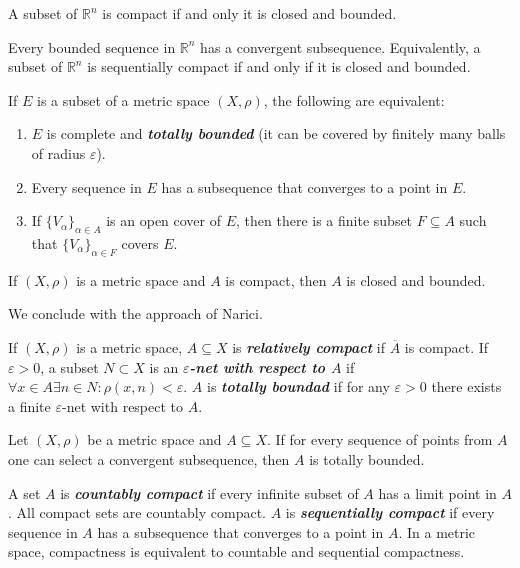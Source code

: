 \documentclass{article}
\theoremstyle{definition}
\numberwithin{equation}{section}
\newcommand{\R}{\mathbb{R}}
\begin{document}
	\begin{thm}
		A subset of $\R^n$ is compact if and only it is closed and bounded.
	\end{thm}
	\begin{thm}
		Every bounded sequence in $\R^n$ has a convergent subsequence. Equivalently, a subset of $\R^n$ is sequentially compact if and only if it is closed and bounded.
	\end{thm}
	\begin{thm}
		If $E$ is a subset of a metric space $(X,\rho)$, the following are equivalent:
		\begin{enumerate}
			\item $E$ is complete and \textbf{\textit{totally bounded}} (it can be covered by finitely many balls of radius $\varepsilon$).
			\item Every sequence in $E$ has a subsequence that converges to a point in $E$.
			\item If $\{V_\alpha\}_{\alpha\in A}$ is an open cover of $E$, then there is a finite subset $F\subseteq A$ such that $\{V_\alpha\}_{\alpha\in F}$ covers $E$.
		\end{enumerate}
	\end{thm}
	\begin{thm}
		If $(X,\rho)$ is a metric space and $A$ is compact, then $A$ is closed and bounded.
	\end{thm}
	We conclude with the approach of Narici.
	
	If $(X,\rho)$ is a metric space, $A\subseteq X$ is \textbf{\textit{relatively compact}} if $\overline{A}$ is compact. If $\varepsilon>0$, a subset $N\subset X$ is an \textbf{\textit{$\varepsilon$-net with respect to $A$}} if $\forall x\in A\exists n\in N:\rho(x,n)<\varepsilon$. $A$ is \textbf{\textit{totally boundad}} if for any $\varepsilon>0$ there exists a finite $\varepsilon$-net with respect to $A$.
	
	\begin{thm}
		Let $(X,\rho)$ be a metric space and $A\subseteq X$. If for every sequence of points from $A$ one can select a convergent subsequence, then $A$ is totally bounded.
	\end{thm}
	A set $A$ is \textbf{\textit{countably compact}} if every infinite subset of $A$ has a limit point in $A$. All compact sets are countably compact. $A$ is \textbf{\textit{sequentially compact}} if every sequence in $A$ has a subsequence that converges to a point in $A$. In a metric space, compactness is equivalent to countable and sequential compactness.
	
\end{document}
